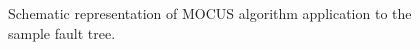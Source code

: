 \begin{figure}[h!]
  
  \caption{Schematic representation of MOCUS algorithm application to the sample fault tree.}
  \label{fig:mocus_flow}
\end{figure}